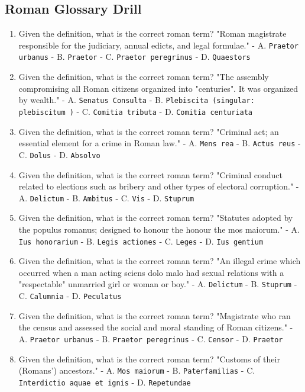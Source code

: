 \documentclass[11pt]{article}
\begin{document}
\subsection{Roman Glossary Drill}

\begin{enumerate}
\item Given the definition, what is the correct roman term? "Roman magistrate responsible for the judiciary, annual edicts, and legal formulae." - A. \texttt{Praetor urbanus} - B. \texttt{Praetor} - C. \texttt{Praetor peregrinus} - D. \texttt{Quaestors}
\item Given the definition, what is the correct roman term? "The assembly compromising all Roman citizens organized into "centuries". It was organized by wealth." - A. \texttt{Senatus Consulta} - B. \texttt{Plebiscita (singular: plebiscitum )} - C. \texttt{Comitia tributa} - D. \texttt{Comitia centuriata}
\item Given the definition, what is the correct roman term? "Criminal act; an essential element for a crime in Roman law." - A. \texttt{Mens rea} - B. \texttt{Actus reus} - C. \texttt{Dolus} - D. \texttt{Absolvo}
\item Given the definition, what is the correct roman term? "Criminal conduct related to elections such as bribery and other types of electoral corruption." - A. \texttt{Delictum} - B. \texttt{Ambitus} - C. \texttt{Vis} - D. \texttt{Stuprum}
\item Given the definition, what is the correct roman term? "Statutes adopted by the populus romanus; designed to honour the honour the mos maiorum." - A. \texttt{Ius honorarium} - B. \texttt{Legis actiones} - C. \texttt{Leges} - D. \texttt{Ius gentium}
\item Given the definition, what is the correct roman term? "An illegal crime which occurred when a man acting sciens dolo malo had sexual relations with a "respectable" unmarried girl or woman or boy." - A. \texttt{Delictum} - B. \texttt{Stuprum} - C. \texttt{Calumnia} - D. \texttt{Peculatus}
\item Given the definition, what is the correct roman term? "Magistrate who ran the census and assessed the social and moral standing of Roman citizens." - A. \texttt{Praetor urbanus} - B. \texttt{Praetor peregrinus} - C. \texttt{Censor} - D. \texttt{Praetor}
\item Given the definition, what is the correct roman term? "Customs of their (Romans') ancestors." - A. \texttt{Mos maiorum} - B. \texttt{Paterfamilias} - C. \texttt{Interdictio aquae et ignis} - D. \texttt{Repetundae}

\end{enumerate}
\end{document}

